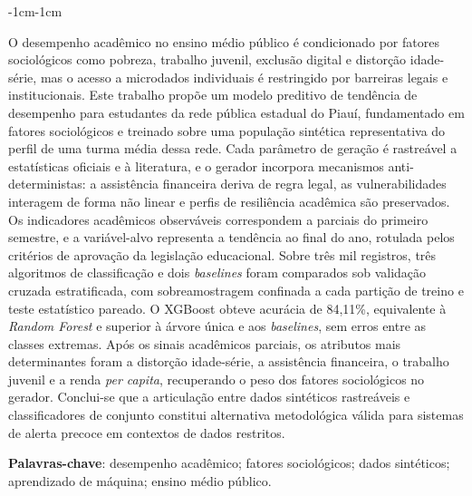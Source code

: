 \begin{adjustwidth}{-1cm}{-1cm}\vspace{\onelineskip}


\begin{resumo}

O desempenho acadêmico no ensino médio público é condicionado por fatores sociológicos como pobreza, trabalho juvenil, exclusão digital e distorção idade-série, mas o acesso a microdados individuais é restringido por barreiras legais e institucionais. Este trabalho propõe um modelo preditivo de tendência de desempenho para estudantes da rede pública estadual do Piauí, fundamentado em fatores sociológicos e treinado sobre uma população sintética representativa do perfil de uma turma média dessa rede. Cada parâmetro de geração é rastreável a estatísticas oficiais e à literatura, e o gerador incorpora mecanismos anti-deterministas: a assistência financeira deriva de regra legal, as vulnerabilidades interagem de forma não linear e perfis de resiliência acadêmica são preservados. Os indicadores acadêmicos observáveis correspondem a parciais do primeiro semestre, e a variável-alvo representa a tendência ao final do ano, rotulada pelos critérios de aprovação da legislação educacional. Sobre três mil registros, três algoritmos de classificação e dois \textit{baselines} foram comparados sob validação cruzada estratificada, com sobreamostragem confinada a cada partição de treino e teste estatístico pareado. O XGBoost obteve acurácia de 84,11\%, equivalente à \textit{Random Forest} e superior à árvore única e aos \textit{baselines}, sem erros entre as classes extremas. Após os sinais acadêmicos parciais, os atributos mais determinantes foram a distorção idade-série, a assistência financeira, o trabalho juvenil e a renda \textit{per capita}, recuperando o peso dos fatores sociológicos no gerador. Conclui-se que a articulação entre dados sintéticos rastreáveis e classificadores de conjunto constitui alternativa metodológica válida para sistemas de alerta precoce em contextos de dados restritos.
\vspace{\onelineskip}
\noindent

\textbf{Palavras-chave}: desempenho acadêmico; fatores sociológicos; dados sintéticos; aprendizado de máquina; ensino médio público.

\end{resumo}
\end{adjustwidth}
